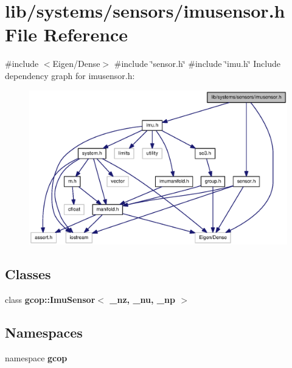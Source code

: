 \section{lib/systems/sensors/imusensor.h \-File \-Reference}
\label{imusensor_8h}
{\ttfamily \#include $<$\-Eigen/\-Dense$>$}\*
{\ttfamily \#include \char`\"{}sensor.\-h\char`\"{}}\*
{\ttfamily \#include \char`\"{}imu.\-h\char`\"{}}\*
\-Include dependency graph for imusensor.\-h\-:
\nopagebreak
\begin{figure}[H]
\begin{center}
\leavevmode
\includegraphics[width=350pt]{imusensor_8h__incl}
\end{center}
\end{figure}
\subsection*{\-Classes}
\begin{DoxyCompactItemize}
\item 
class {\bf gcop\-::\-Imu\-Sensor$<$ \-\_\-nz, \-\_\-nu, \-\_\-np $>$}
\end{DoxyCompactItemize}
\subsection*{\-Namespaces}
\begin{DoxyCompactItemize}
\item 
namespace {\bf gcop}
\end{DoxyCompactItemize}
